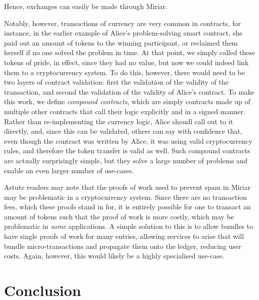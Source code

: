 \documentclass{extreport}
\begin{document}
Hence, exchanges can easily be made through Miriar.

Notably, however, transactions of currency are very common in contracts, for instance, in the earlier example of Alice's problem-solving smart contract, she paid out an amount of tokens to the winning participant, or reclaimed them herself if no one solved the problem in time. At that point, we simply called these tokens of pride, in effect, since they had no value, but now we could indeed link them to a cryptocurrency system. To do this, however, there would need to be two layers of contract validation: first the validation of the validity of the transaction, and second the validation of the validity of Alice's contract. To make this work, we define \emph{compound contracts}, which are simply contracts made up of multiple other contracts that call their logic explicitly and in a signed manner. Rather than re-implementing the currency logic, Alice shoudl call out to it directly, and, since this can be validated, others can say with confidence that, even though the contract was written by Alice, it was using valid cryptocurrency rules, and therefore the token transfer is valid as well. Such compound contracts are actually surprisingly simple, but they solve a large number of problems and enable an even larger number of use-cases.

Astute readers may note that the proofs of work used to prevent spam in Miriar may be problematic in a cryptocurrency system. Since there are no transaction fees, which these proofs stand in for, it is entirely possible for one to transact an amount of tokens such that the proof of work is more costly, which may be problematic in \emph{some} applications. A simple solution to this is to allow bundles to have single proofs of work for many entries, allowing services to arise that will bundle micro-transactions and propagate them onto the ledger, reducing user costs. Again, however, this would likely be a highly specialised use-case.

\part{Conclusion}
\label{sec:orgce41842}
\end{document}
